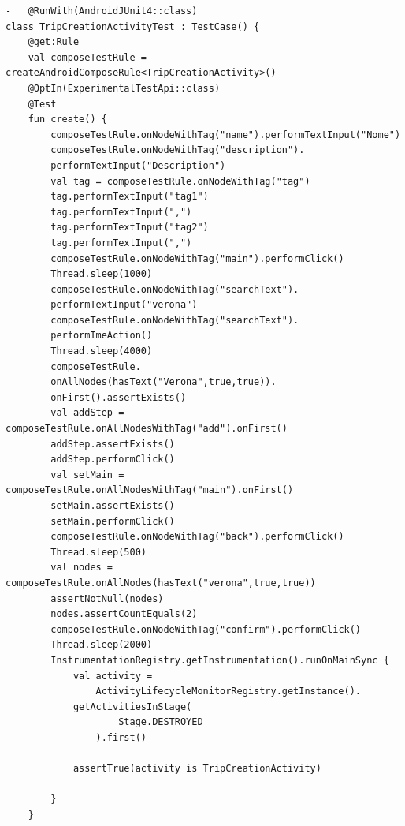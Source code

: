 \begin{verbatim}
-	@RunWith(AndroidJUnit4::class)
class TripCreationActivityTest : TestCase() {
    @get:Rule
    val composeTestRule = createAndroidComposeRule<TripCreationActivity>()
    @OptIn(ExperimentalTestApi::class)
    @Test
    fun create() {
        composeTestRule.onNodeWithTag("name").performTextInput("Nome")
        composeTestRule.onNodeWithTag("description").
        performTextInput("Description")
        val tag = composeTestRule.onNodeWithTag("tag")
        tag.performTextInput("tag1")
        tag.performTextInput(",")
        tag.performTextInput("tag2")
        tag.performTextInput(",")
        composeTestRule.onNodeWithTag("main").performClick()
        Thread.sleep(1000)
        composeTestRule.onNodeWithTag("searchText").
        performTextInput("verona")
        composeTestRule.onNodeWithTag("searchText").
        performImeAction()
        Thread.sleep(4000)
        composeTestRule.
        onAllNodes(hasText("Verona",true,true)).
        onFirst().assertExists()
        val addStep = composeTestRule.onAllNodesWithTag("add").onFirst()
        addStep.assertExists()
        addStep.performClick()
        val setMain = composeTestRule.onAllNodesWithTag("main").onFirst()
        setMain.assertExists()
        setMain.performClick()
        composeTestRule.onNodeWithTag("back").performClick()
        Thread.sleep(500)
        val nodes = composeTestRule.onAllNodes(hasText("verona",true,true))
        assertNotNull(nodes)
        nodes.assertCountEquals(2)
        composeTestRule.onNodeWithTag("confirm").performClick()
        Thread.sleep(2000)
        InstrumentationRegistry.getInstrumentation().runOnMainSync {
            val activity =
                ActivityLifecycleMonitorRegistry.getInstance().
            getActivitiesInStage(
                    Stage.DESTROYED
                ).first()

            assertTrue(activity is TripCreationActivity)

        }
    }
    

\end{verbatim}
